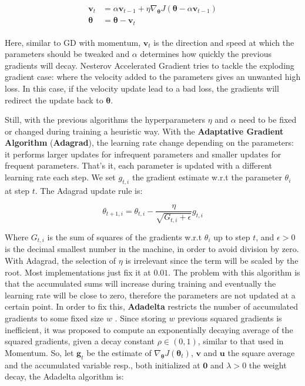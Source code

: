 \begin{align}
    \label{eqn:Nesterov_accelerated_gradient}
    \begin{split}
        \mathbf{v}_t &= \alpha \mathbf{v}_{t-1} + \eta \nabla_{\boldsymbol{\theta}} J(\boldsymbol{\theta} - \alpha \mathbf{v}_{t-1}) \\
        \boldsymbol{\theta} &= \boldsymbol{\theta} - \mathbf{v}_t
    \end{split}
\end{align}

Here, similar to GD with momentum, $\mathbf{v}_t$ is the direction and speed at which the parameters should be tweaked and $\alpha$ determines how quickly the previous gradients will decay. Nesterov Accelerated Gradient tries to tackle the exploding gradient case: where the velocity added to the parameters gives an unwanted high loss. In this case, if the velocity update lead to a bad loss, the gradients will redirect the update back to $\boldsymbol{\theta}$.


Still, with the previous algorithms the hyperparameters $\eta$ and $\alpha$ need to be fixed or changed during training a heuristic way. With the \textbf{Adaptative Gradient Algorithm} (\textbf{Adagrad}), the learning rate change depending on the parameters: it performs larger updates for infrequent parameters and smaller updates for frequent parameters. That's it, each parameter is updated with a different learning rate each step.
We set $g_{t,i}$ the gradient estimate w.r.t the parameter $\theta_i$ at step $t$. The Adagrad update rule is:

\begin{equation}
    \label{eqn:Adagrad}
    \theta_{t+1, i} = \theta_{t,i} - \frac{\eta}{\sqrt{G_{t,i} + \epsilon}} g_{t,i}
\end{equation}

Where $G_{t,i}$ is the sum of squares of the gradients w.r.t $\theta_i$ up to step $t$, and $\epsilon > 0$ is the decimal smallest number in the machine, in order to avoid division by zero. With Adagrad, the selection of $\eta$ is irrelevant since the term will be scaled by the root. Most implementations just fix it at $0.01$. The problem with this algorithm is that the accumulated sums will increase during training and eventually the learning rate will be close to zero, therefore the parameters are not updated at a certain point.
In order to fix this, \textbf{Adadelta} restricts the number of accumulated gradients to some fixed size $w$ \cite{zeiler2012}. Since storing $w$ previous squared gradients is inefficient, it was proposed to compute an exponentially decaying average of the squared gradients, given a decay constant $\rho \in (0,1)$, similar to that used in Momentum. So, let $\mathbf{g}_t$ be the estimate of $\nabla_{\boldsymbol{\theta}} J(\boldsymbol{\theta}_t)$, $\mathbf{v}$ and $\mathbf{u}$ the square average and the accumulated variable resp., both initialized at $\mathbf{0}$ and $\lambda>0$ the weight decay, the Adadelta algorithm is:

